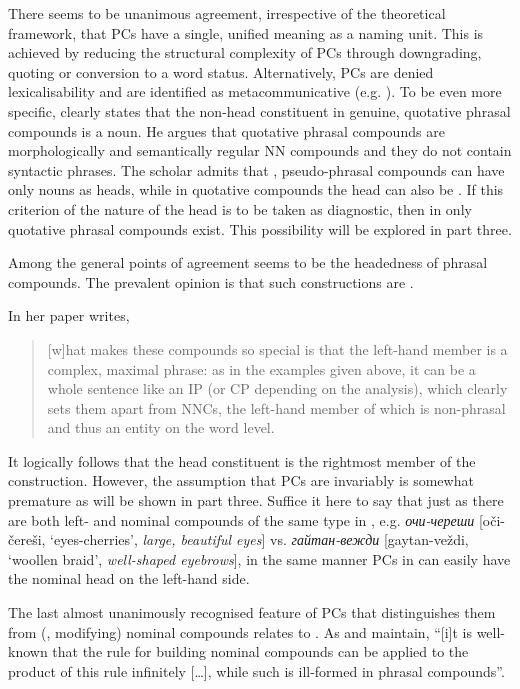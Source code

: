 \documentclass[output=paper]{LSP/langsci}
\begin{document}
There seems to be unanimous agreement, irrespective of the theoretical framework, that PCs have a single, unified meaning as a naming unit. This is achieved by reducing the structural complexity of PCs through downgrading, quoting or conversion to a word status. Alternatively, PCs are denied lexicalisability and are identified as metacommunicative (e.g. \citealt{Hohenhaus2007}). To be even more specific, \citet{Pafel2015} clearly states that the non-head constituent in genuine, quotative phrasal compounds is a noun. He argues that quotative phrasal compounds are morphologically and semantically regular NN compounds and they do not contain syntactic phrases. The scholar admits that , pseudo-phrasal compounds can have only nouns as heads, while in quotative compounds the head can also be . If this criterion of the nature of the head is to be taken as diagnostic, then in  only quotative phrasal compounds exist. This possibility will be explored in part three. 

\largerpage
Among the general points of agreement seems to be the headedness of phrasal compounds. The prevalent opinion is that such constructions are . 

In her paper \citet[322]{Trips2012} writes, 

\begin{quotation}
[w]hat makes these compounds so special is that the left-hand member is a complex, maximal phrase: as in the examples given above, it can be a whole sentence like an IP (or CP depending on the analysis), which clearly sets them apart from NNCs, the left-hand member of which is non-phrasal and thus an entity on the word level.
\end{quotation}

It logically follows that the head constituent is the rightmost member of the construction. However, the assumption that PCs are invariably  is somewhat premature as will be shown in part three. Suffice it here to say that just as there are both left- and  nominal compounds of the same type in , e.g. \textit{{очи}-{череши} }[oči-čereši, ‘eyes-cherries’, \textit{large, beautiful eyes}] vs. \textit{{гайтан-вежди}} [gaytan-veždi, ‘woollen braid’, \textit{well-shaped eyebrows}], in the same manner PCs in  can easily have the nominal head on the left-hand side.

The last almost unanimously recognised feature of PCs that distinguishes them from  (, modifying) nominal compounds relates to . As \citet{Trips2012} and \citet[286]{Trips2016} maintain, “[i]t is well-known that the rule for building  nominal compounds can be applied to the product of this rule infinitely […], while such  is ill-formed in phrasal compounds”.  
\end{document}
